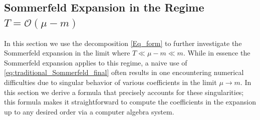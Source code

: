 \documentclass[sn-mathphys,Numbered]{sn-jnl}
\begin{document}
\subsection{Sommerfeld Expansion in the Regime $T=\mathcal{O}(\mu-m)$}\label{sec:asymp_T_0_faster}

In this section we use the decomposition \eqref{Eq_form} to further investigate the Sommerfeld expansion   in the limit where $T\ll\mu-m\ll m$.  While in essence the Sommerfeld expansion applies to this regime, a naive use of \eqref{eq:traditional_Sommerfeld_final} often results in one encountering numerical difficulties due to singular behavior of various coefficients in the limit $\mu\to m$.  In this section we derive a formula that precisely accounts for these singularities; this formula makes it straightforward   to  compute the coefficients in the expansion up to any desired order via a computer algebra system.
\end{document}
